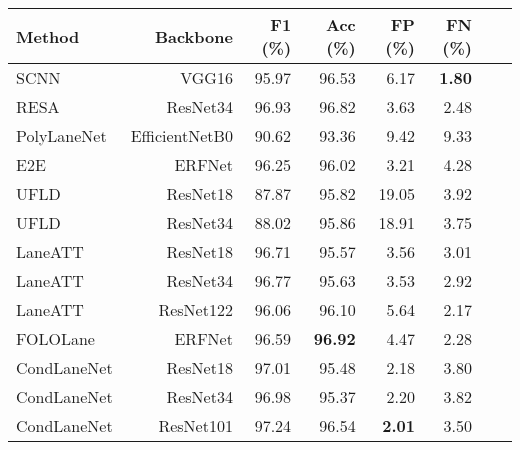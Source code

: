 \begin{table}[]
    \centering
    \captionsetup{justification=centering,margin=2cm}
    \begin{tabular}{@{}lrrrrrrr@{}}
        \toprule
        \textbf{Method} & \textbf{Backbone}        & \textbf{F1 (\%)} & \textbf{Acc (\%)}  & \textbf{FP (\%)} & \textbf{FN (\%)} \\ \midrule
        
        SCNN~\cite{pan2018spatial} & VGG16 & 95.97 & 96.53  & 6.17 & \textbf{1.80} \\
        
        RESA~\cite{zheng2021resa} & ResNet34 & 96.93 & 96.82 & 3.63 & 2.48  \\
        
        PolyLaneNet~\cite{tabelini2021polylanenet}  & EfficientNetB0 & 90.62 & 93.36 & 9.42 & 9.33 \\
        
        E2E~\cite{yoo2020end}  & ERFNet  & 96.25  & 96.02  & 3.21 & 4.28 \\
        
        UFLD\cite{qin2020ultra} & ResNet18 & 87.87 & 95.82 & 19.05 & 3.92 \\
        
        UFLD\cite{qin2020ultra}  &  ResNet34 & 88.02 & 95.86  & 18.91 & 3.75 \\
        
        LaneATT\cite{tabelini2021keep} & ResNet18 & 96.71 & 95.57 & 3.56 & 3.01 \\
        
        LaneATT\cite{tabelini2021keep} & ResNet34 & 96.77 & 95.63 & 3.53 & 2.92 \\
        
        LaneATT\cite{tabelini2021keep} & ResNet122 & 96.06 & 96.10 & 5.64 & 2.17 \\
        
        FOLOLane\cite{qu2021focus} & ERFNet & 96.59 & \textbf{96.92} & 4.47 & 2.28 \\
        
        CondLaneNet\cite{liu2021condlanenet} & ResNet18 & 97.01 & 95.48 & 2.18 & 3.80 \\
        
        CondLaneNet\cite{liu2021condlanenet} & ResNet34 & 96.98 & 95.37  & 2.20 & 3.82 \\
        
        CondLaneNet\cite{liu2021condlanenet} & ResNet101 & 97.24 & 96.54 & \textbf{2.01} & 3.50 \\
        \midrule


\end{tabular}
\end{table}
